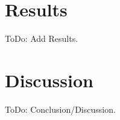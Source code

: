 \documentclass[9pt]{pnas-new}
\begin{document}
\section*{Results}
ToDo: Add Results.
\section*{Discussion}
ToDo: Conclusion/Discussion.
\showacknow %


\begin{multicols}{2}
	\section*{\bibname}
	
\end{multicols}
\end{document}
